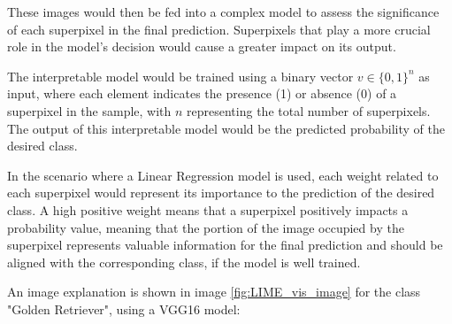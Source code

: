 These images would then be fed into a complex model to assess the significance of each superpixel in the final prediction. 
Superpixels that play a more crucial role in the model's decision would cause a greater impact on its output.

The interpretable model would be trained using a binary vector \(v \in \{0, 1\}^n\) as input, where each element indicates the presence (1) or absence (0) of a superpixel in the sample, with \(n\) representing the total number of superpixels. 
The output of this interpretable model would be the predicted probability of the desired class.

In the scenario where a Linear Regression model is used, each weight related to each superpixel would represent its importance to the prediction of the desired class.
A high positive weight means that a superpixel positively impacts a probability value, meaning that the portion of the image occupied by the superpixel represents valuable information for the final prediction and should be aligned with the corresponding class, if the model is well trained.

\newpage

An image explanation is shown in image \ref{fig:LIME_vis_image} for the class "Golden Retriever", using a VGG16 model:


